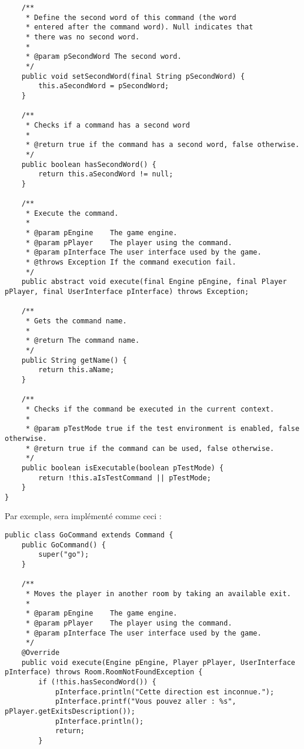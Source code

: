 \begin{exercise}[subtitle=Commande abstraite]
\begin{verbatim}
    /**
     * Define the second word of this command (the word
     * entered after the command word). Null indicates that
     * there was no second word.
     *
     * @param pSecondWord The second word.
     */
    public void setSecondWord(final String pSecondWord) {
        this.aSecondWord = pSecondWord;
    }

    /**
     * Checks if a command has a second word
     *
     * @return true if the command has a second word, false otherwise.
     */
    public boolean hasSecondWord() {
        return this.aSecondWord != null;
    }

    /**
     * Execute the command.
     *
     * @param pEngine    The game engine.
     * @param pPlayer    The player using the command.
     * @param pInterface The user interface used by the game.
     * @throws Exception If the command execution fail.
     */
    public abstract void execute(final Engine pEngine, final Player pPlayer, final UserInterface pInterface) throws Exception;

    /**
     * Gets the command name.
     *
     * @return The command name.
     */
    public String getName() {
        return this.aName;
    }

    /**
     * Checks if the command be executed in the current context.
     *
     * @param pTestMode true if the test environment is enabled, false otherwise.
     * @return true if the command can be used, false otherwise.
     */
    public boolean isExecutable(boolean pTestMode) {
        return !this.aIsTestCommand || pTestMode;
    }
}
\end{verbatim}

Par exemple,  sera implémenté comme ceci :

\begin{verbatim}
public class GoCommand extends Command {
    public GoCommand() {
        super("go");
    }

    /**
     * Moves the player in another room by taking an available exit.
     *
     * @param pEngine    The game engine.
     * @param pPlayer    The player using the command.
     * @param pInterface The user interface used by the game.
     */
    @Override
    public void execute(Engine pEngine, Player pPlayer, UserInterface pInterface) throws Room.RoomNotFoundException {
        if (!this.hasSecondWord()) {
            pInterface.println("Cette direction est inconnue.");
            pInterface.printf("Vous pouvez aller : %s", pPlayer.getExitsDescription());
            pInterface.println();
            return;
        }


\end{verbatim}
\end{exercise}
